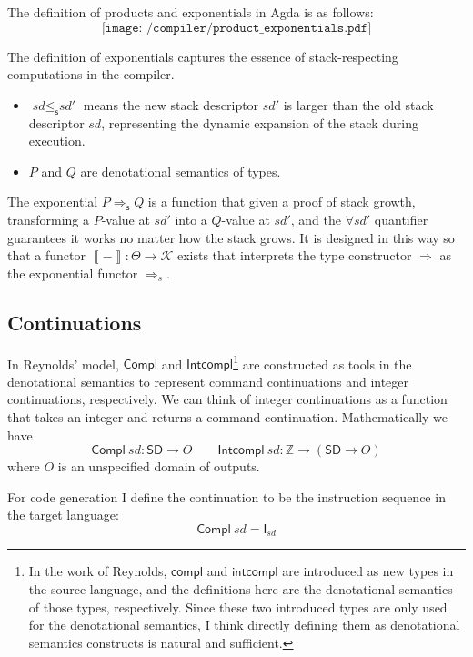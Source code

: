 \documentclass[12pt,a4paper]{report}
\theoremstyle{definition}
\newcommand{\bZ}{\ensuremath{\mathbb{Z}}}
\newcommand{\intp}[1]{\left\llbracket #1 \right\rrbracket}
\begin{document}
    The definition of products and exponentials in Agda is as follows:
    \[\texttt{[image: /compiler/product\_exponentials.pdf]}\]

    The definition of exponentials captures the essence of stack-respecting computations in the compiler. 
    \begin{itemize}
        \item $\textit{sd} \leq_\mathsf{s} \textit{sd′}$ means the new stack descriptor $\textit{sd′}$ is larger than the old stack descriptor $\textit{sd}$, representing the dynamic expansion of the stack during execution.

        \item $P$ and $Q$ are denotational semantics of types. 
    \end{itemize}
    The exponential $P \Rightarrow_\textsf{s} Q$ is a function that given a proof of stack growth, transforming a $P$-value at $\textit{sd′}$ into a $Q$-value at $\textit{sd′}$, and the $\forall{\textit{sd′}}$ quantifier guarantees it works no matter how the stack grows. It is designed in this way so that a functor $\intp{-} : \Theta \to \mathcal{K}$ exists that interprets the type constructor $\Rightarrow$ as the exponential functor $\Rightarrow_s$.

    \subsection{Continuations}
    In Reynolds' model, $\mathsf{Compl}$ and $\mathsf{Intcompl}$\footnote{In the work of Reynolds, $\mathsf{compl}$ and $\mathsf{intcompl}$ are introduced as new types in the source language, and the definitions here are the denotational semantics of those types, respectively. Since these two introduced types are only used for the denotational semantics, I think directly defining them as denotational semantics constructs is natural and sufficient.} are constructed as tools in the denotational semantics to represent command continuations and integer continuations, respectively. We can think of integer continuations as a function that takes an integer and returns a command continuation. Mathematically we have
    \[\mathsf{Compl}\ \textit{sd} : \mathsf{SD} \to O \qquad \mathsf{Intcompl}\ \textit{sd} : \bZ \to (\mathsf{SD} \to O)\]
    where $O$ is an unspecified domain of outputs.

    For code generation I define the continuation to be the instruction sequence in the target language:
    \[\mathsf{Compl}\ \textit{sd} = \textsf{I}_{\textit{sd}}\]
\end{document}
